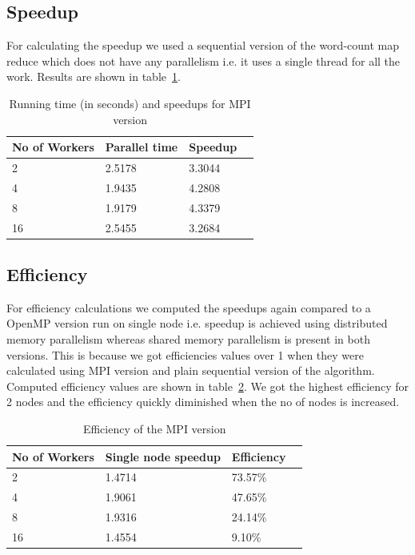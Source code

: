 \documentclass[12pt]{article}
\begin{document}
\subsection{Speedup}
For calculating the speedup we used a sequential version of the word-count map reduce which does not have any parallelism i.e. it uses a single thread for
all the work. Results are shown in table~\ref{speedup-tbl}.
\begin{table}[ht]
\centering
\begin{tabular}{|l|l|l|l|}
\hline
 No of Workers & Parallel time  & Speedup \\ \hline
 2  & 2.5178 & 3.3044 \\ \hline
 4  & 1.9435 & 4.2808  \\ \hline
 8  & 1.9179 & 4.3379   \\ \hline
 16 & 2.5455 & 3.2684   \\ \hline
\end{tabular}
    \caption{Running time (in seconds) and speedups for MPI version \label{speedup-tbl}}
\end{table}
\subsection{Efficiency}
For efficiency calculations we computed the speedups again compared to a OpenMP version run on single node i.e. speedup is achieved using distributed memory 
parallelism whereas shared memory parallelism is present in both versions. This is because we got efficiencies values over 1 when they were calculated using MPI version and plain sequential version of the 
algorithm. Computed efficiency values are shown in table~\ref{eff-tbl}. We got the highest efficiency for 2 nodes and the efficiency quickly diminished when the 
no of nodes is increased.
\begin{table}[ht]
\centering
\begin{tabular}{|l|l|l|l|}
\hline
 No of Workers & Single node speedup  & Efficiency \\ \hline
    2  & 1.4714 & 73.57\%   \\ \hline
    4  &  1.9061 & 47.65\% \\ \hline
    8  & 1.9316 & 24.14\% \\ \hline
    16 &  1.4554 & 9.10\% \\ \hline
\end{tabular}
\caption{Efficiency of the MPI version \label{eff-tbl}}
\end{table}
\end{document}
